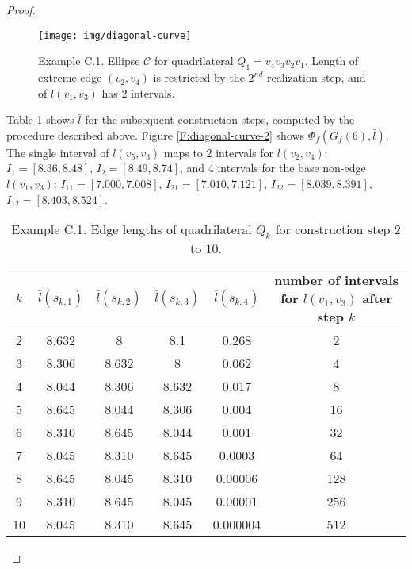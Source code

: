 \documentclass[secthm,amsthm,english]{article}
\theoremstyle{definition}
\theoremstyle{remark}
\begin{document}
\begin{proof}
\begin{figure}[h]
	
	  
	 
	
	\begin{centering}
	\texttt{[image: img/diagonal-curve]} 
	\par\end{centering}
	
	\caption{Example C.1. Ellipse $\mathcal{C}$ for quadrilateral $Q_1 = v_{4}v_{3}v_{2}v_{1}$.
	Length of extreme edge $(v_{2},v_{4})$ is restricted by the 
	$2^{nd}$ realization step, and of $l(v_{1},v_{3})$ has
	2 intervals. }

\label{F:diagonal-curve} 
\end{figure}



Table \ref{T:edge-length} shows $\bar{l}$ for
the subsequent construction steps, computed by the procedure described above. 
Figure \ref{F:diagonal-curve-2} shows $\Phi_{f}(G_{f}(6),\bar{l})$. 
The single interval of $l(v_{5},v_{3})$ maps to 2 intervals
for $l(v_{2},v_{4})$: $I_{1}=[8.36,8.48]$, $I_{2}=[8.49,8.74]$,
and 4 intervals for the base non-edge $l(v_{1},v_{3})$:
$I_{11}=[7.000,7.008]$, $I_{21}=[7.010,7.121]$, $I_{22}=[8.039,8.391]$,
$I_{12}=[8.403,8.524]$. 

\begin{centering}
\begin{table}
	\begin{tabular}{|c|c|c|c|c|c|}
	\hline 
	$k$ & $\bar{l}(s_{k,1})$ & $\bar{l}(s_{k,2})$ & $\bar{l}(s_{k,3})$ & $\bar{l}(s_{k,4})$ & number of intervals for $l(v_{1},v_{3})$ after step $k$ \\
	\hline
	\hline 
	2 & 8.632 & 8 & 8.1 & 0.268 & 2 \\
	\hline 
	3 & 8.306 & 8.632 & 8 & 0.062 & 4 \\
	\hline 
	4 & 8.044 & 8.306 & 8.632 & 0.017 & 8\\
	\hline 
	5 & 8.645 & 8.044 & 8.306 & 0.004 & 16\\
	\hline 
	6 & 8.310 & 8.645 & 8.044 & 0.001 & 32\\
	\hline 
	7 & 8.045 & 8.310 & 8.645 & 0.0003 & 64\\
	\hline 
	8 & 8.645 & 8.045 & 8.310 & 0.00006 & 128\\
	\hline 
	9 & 8.310 & 8.645 & 8.045 & 0.00001 & 256\\
	\hline 
	10 & 8.045 & 8.310 & 8.645 & 0.000004 & 512\\
	\hline
	\end{tabular}
\medskip	
\caption{Example C.1. Edge lengths of quadrilateral $Q_{k}$ for construction step $2$ to $10$.}
\label{T:edge-length}
\end{table}
\end{centering}


\end{proof}
\end{document}
